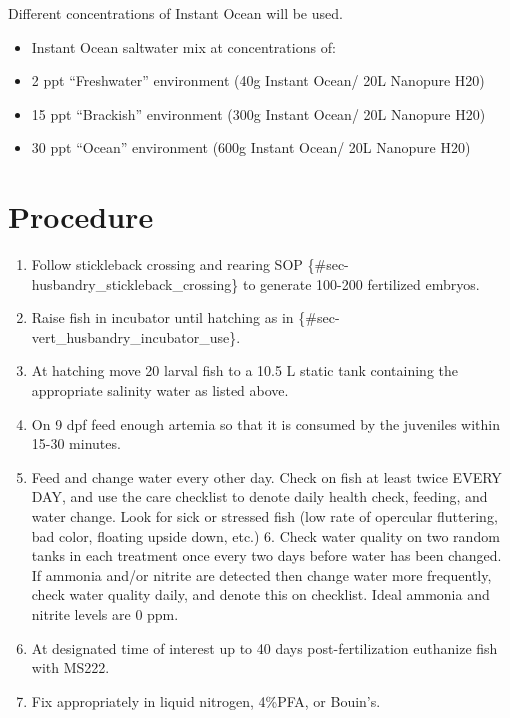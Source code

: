 \documentclass[
  letterpaper,
  DIV=11,
  numbers=noendperiod]{scrreprt}
\providecommand{\tightlist}{%
  \setlength{\itemsep}{0pt}\setlength{\parskip}{0pt}}\usepackage{longtable,booktabs,array}
\begin{document}
Different concentrations of Instant Ocean will be used.

\begin{itemize}
\tightlist
\item
  Instant Ocean saltwater mix at concentrations of:
\item
  2 ppt ``Freshwater'' environment (40g Instant Ocean/ 20L Nanopure H20)
\item
  15 ppt ``Brackish'' environment (300g Instant Ocean/ 20L Nanopure H20)
\item
  30 ppt ``Ocean'' environment (600g Instant Ocean/ 20L Nanopure H20)
\end{itemize}

\hypertarget{procedure-77}{%
\section{Procedure}\label{procedure-77}}

\begin{enumerate}
\def\labelenumi{\arabic{enumi}.}
\tightlist
\item
  Follow stickleback crossing and rearing SOP
  \{\#sec-husbandry\_stickleback\_crossing\} to generate 100-200
  fertilized embryos.
\item
  Raise fish in incubator until hatching as in
  \{\#sec-vert\_husbandry\_incubator\_use\}.
\item
  At hatching move 20 larval fish to a 10.5 L static tank containing the
  appropriate salinity water as listed above.
\item
  On 9 dpf feed enough artemia so that it is consumed by the juveniles
  within 15-30 minutes.
\item
  Feed and change water every other day. Check on fish at least twice
  EVERY DAY, and use the care checklist to denote daily health check,
  feeding, and water change. Look for sick or stressed fish (low rate of
  opercular fluttering, bad color, floating upside down, etc.) 6. Check
  water quality on two random tanks in each treatment once every two
  days before water has been changed. If ammonia and/or nitrite are
  detected then change water more frequently, check water quality daily,
  and denote this on checklist. Ideal ammonia and nitrite levels are 0
  ppm.
\item
  At designated time of interest up to 40 days post-fertilization
  euthanize fish with MS222.
\item
  Fix appropriately in liquid nitrogen, 4\%PFA, or Bouin's.
\end{enumerate}
\end{document}
